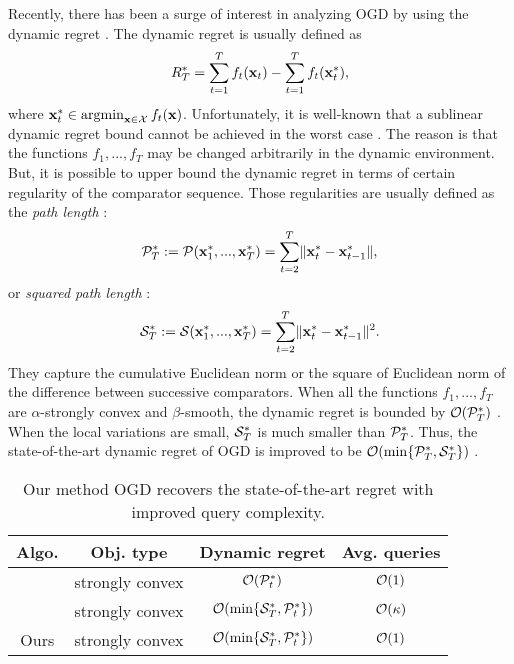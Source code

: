 \documentclass{article}
\begin{document}
Recently, there has been a surge of interest in analyzing OGD by using the dynamic regret \cite{Zinkevich:2003,Mokhtari:2016jz,Yang:2016ud,Lei:2017:CUO}. The dynamic regret is usually defined as 
\begin{align}
\label{eq:regret_dy}
R_T^{\ast} = \sum\limits_{t=1}^T f_t({\bf x}_t) - \sum\limits_{t=1}^T f_t({\bf x}_t^{\ast}), 
\end{align} where $\x_t^{\ast} \in \argmin_{\x\in\Xcal} f_t(\x)$. Unfortunately, it is well-known that a sublinear dynamic regret bound cannot be achieved in the worst case \cite{Zinkevich:2003}. The reason is that the functions $f_1, ..., f_T$ may be changed arbitrarily in the dynamic environment. But, it is possible to upper bound the dynamic regret in terms of certain regularity of the comparator sequence. Those regularities are usually defined as the \textit{path length} \cite{Mokhtari:2016jz,Yang:2016ud}: 
\begin{align}
\nonumber
{\mathcal{P}}_T^{\ast} := {\mathcal{P}}({\bf x}_1^{\ast}, ..., {\bf x}_T^{\ast}) = \sum\limits_{t=2}^T \lVert{\bf x}_t^{\ast} - {\bf x}_{t-1}^{\ast}\rVert,
\end{align}  or \textit{squared path length} \cite{Zhang:2016wl}: 
\begin{align}
\nonumber
{\mathcal{S}}_T^{\ast} := {\mathcal{S}}({\bf x}_1^{\ast}, ..., {\bf x}_T^{\ast}) = \sum\limits_{t=2}^T \lVert{\bf x}_t^{\ast} - {\bf x}_{t-1}^{\ast}\rVert^2.
\end{align} They capture the cumulative Euclidean norm or the square of Euclidean norm of the difference between successive comparators. When all the functions $f_1, ..., f_T$ are $\alpha$-strongly convex and $\beta$-smooth, the dynamic regret is bounded by ${\mathcal{O}}({\mathcal{P}}_T^{\ast})$ \cite{Mokhtari:2016jz}.  When the local variations are small, ${\mathcal{S}}_T^{\ast}$ is much smaller than ${\mathcal{P}}_T^{\ast}$. Thus, the state-of-the-art dynamic regret of OGD is improved to be ${\mathcal{O}}(\min\{{\mathcal{P}}_T^{\ast}, {\mathcal{S}}_T^{\ast}\})$ \cite{Zhang:2016wl}. 

\begin{table}
\centering
\caption{ Our method OGD recovers the state-of-the-art regret with improved query complexity.   }
\begin{tabular}{c|c|c|c}
\hline 
Algo. & Obj.  type  & Dynamic regret & Avg. queries\tabularnewline
\hline
\hline 
\cite{Mokhtari:2016jz} & strongly convex  & ${\mathcal{O}}({\mathcal{P}}_t^{\ast})$ & ${\mathcal{O}}(1)$\tabularnewline \hline
\cite{Zhang:2016wl} & strongly convex  & ${\mathcal{O}}( \min\{{\mathcal{S}}_T^{\ast}, {\mathcal{P}}_t^{\ast}\} )$ & ${\mathcal{O}}(\kappa)$\tabularnewline
\hline 
Ours & strongly convex  & ${\mathcal{O}}( \min\{{\mathcal{S}}_T^{\ast}, {\mathcal{P}}_t^{\ast}\} )$  & ${\mathcal{O}}(1)$\tabularnewline
\hline 
\end{tabular}
\label{table_dynamic_regret}
\end{table}
\end{document}
